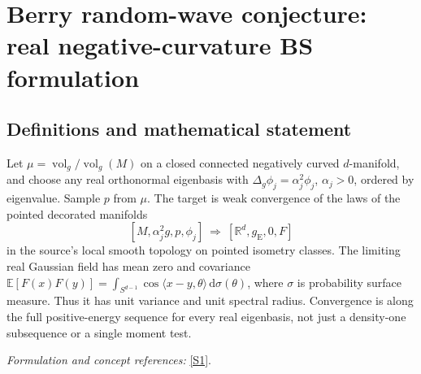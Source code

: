 \documentclass[11pt,a4paper]{article}
\newcommand{\R}{\mathbb{R}}
\newcommand{\E}{\mathbb{E}}
\newcommand{\dd}{\,\mathrm d}
\newcommand{\sref}[2]{\hyperlink{source:#1:#2}{[S#2]}}
\newif\ifshowcatalogue
\newcommand{\cataloguescope}[1]{\ifshowcatalogue
 \paragraph{Exact scope in the supplied catalogue.}
 \begin{quote}\small #1\end{quote}\fi}
\numberwithin{equation}{section}
\begin{document}
\setcounter{section}{228}
\clearpage
\section{\texorpdfstring{Berry random-wave conjecture: real negative-curvature BS formulation}{Berry random-wave conjecture: real negative-curvature BS formulation}}\label{229}
\subsection{Definitions and mathematical statement}
Let $\mu=\operatorname{vol}_g/\operatorname{vol}_g(M)$ on a closed connected negatively curved $d$-manifold, and choose any real orthonormal eigenbasis with
$\Delta_g\phi_j=\alpha_j^2\phi_j$, $\alpha_j>0$, ordered by eigenvalue. Sample $p$ from $\mu$. The target is weak convergence of the laws of the pointed decorated manifolds
\[
 [M,\alpha_j^2g,p,\phi_j]\ \Longrightarrow\ [\R^d,g_{\mathrm E},0,F]
\]
in the source's local smooth topology on pointed isometry classes. The limiting real Gaussian field has mean zero and covariance
$\E[F(x)F(y)]=\int_{S^{d-1}}\cos\langle x-y,\theta\rangle\dd\sigma(\theta)$,
where $\sigma$ is probability surface measure. Thus it has unit variance and unit spectral radius. Convergence is along the full positive-energy sequence for every real eigenbasis, not just a density-one subsequence or a single moment test.
\par\smallskip\textit{Formulation and concept references:} \sref{229}{1}.
\cataloguescope{For every closed connected smooth Riemannian manifold (M,g) of dimension d>=2 with everywhere strictly negative sectional curvature, put mu=dvol\_g/vol\_g(M). For any real orthonormal eigenbasis of L2(M,mu) for the positive Laplace-Beltrami operator, order the eigenvalues nondecreasingly and omit the finite zero-eigenspace; write Delta\_g phi\_j=alpha\_j\textasciicircum{}2 phi\_j with alpha\_j>0. If p is sampled with law mu, does the law of the pointed real-decorated manifold [M,alpha\_j\textasciicircum{}2 g,p,phi\_j] converge weakly, along the full positive-energy sequence, in Abert-Bergeron-Le Masson's local smooth topology on pointed isometry classes of real-decorated d-manifolds, to the law of [R\textasciicircum{}d,g\_Euclidean,0,F]? Here F is the centered real stationary isotropic Gaussian field with covariance E[F(x)F(y)]=integral\_\{S\textasciicircum{}\{d-1\}\} cos(<x-y,theta>) d sigma(theta), where sigma is probability surface measure on the unit sphere (unit variance and unit spectral radius, no extra 2*pi factor).}
\end{document}
